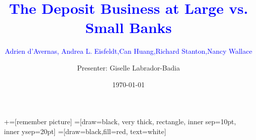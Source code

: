 \documentclass[notes,10pt, aspectratio=169]{beamer}
\title[]{\textcolor{blue}{The Deposit Business at Large vs. Small Banks}} %
\subtitle{\textcolor{blue}{Adrien d'Avernas, Andrea L. Eisfeldt,Can Huang,Richard Stanton,Nancy Wallace}}
\author{Presenter: Giselle Labrador-Badia}
\institute{University of Wisconsin-Madison}
\date{\today}
\newenvironment{wideitemize}{\itemize\addtolength{\itemsep}{10pt}}{\enditemize}
\begin{document}
\newcommand\marktopleft[1]{%
 \tikz[overlay,remember picture] 
 \node (marker-#1-a) at (-.3em,.3em) {};%
}
\newcommand\markbottomright[2]{%
 \tikz[overlay,remember picture] 
 \node (marker-#1-b) at (0em,0em) {};%
}
+=[remember picture] 
 =[draw=black, very thick, rectangle, inner sep=10pt, inner ysep=20pt]
 =[draw=black,fill=red, text=white]

\begin{frame}[noframenumbering]
 \maketitle
\end{frame}





        


\end{document}

